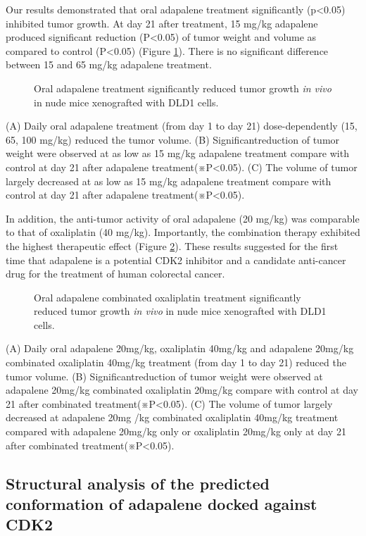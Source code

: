 Our results demonstrated that oral adapalene treatment significantly (p<0.05) inhibited tumor growth. At day 21 after treatment, 15 mg/kg adapalene produced significant reduction (P<0.05) of tumor weight and volume as compared to control (P<0.05) (Figure \ref{cdk2:Figure4}). There is no significant difference between 15 and 65 mg/kg adapalene treatment.

\begin{figure}
\centering
\caption{Oral adapalene treatment significantly reduced tumor growth \textit{in vivo} in nude mice xenografted with DLD1 cells.}
\label{cdk2:Figure4}
\end{figure}
(A) Daily oral adapalene treatment (from day 1 to day 21) dose-dependently (15, 65, 100 mg/kg) reduced the tumor volume. (B) Significantreduction of tumor weight were observed at as low as 15 mg/kg adapalene treatment compare with control at day 21 after adapalene treatment(※P<0.05). (C) The volume of tumor largely decreased at as low as 15 mg/kg adapalene treatment compare with control at day 21 after adapalene treatment(※P<0.05).

In addition, the anti-tumor activity of oral adapalene (20 mg/kg) was comparable to that of oxaliplatin (40 mg/kg). Importantly, the combination therapy exhibited the highest therapeutic effect (Figure \ref{cdk2:Figure5}). These results suggested for the first time that adapalene is a potential CDK2 inhibitor and a candidate anti-cancer drug for the treatment of human colorectal cancer.

\begin{figure}
\centering
\caption{Oral adapalene combinated oxaliplatin treatment significantly reduced tumor growth \textit{in vivo} in nude mice xenografted with DLD1 cells.}
\label{cdk2:Figure5}
\end{figure}
(A) Daily oral adapalene 20mg/kg, oxaliplatin 40mg/kg and adapalene 20mg/kg combinated oxaliplatin 40mg/kg treatment (from day 1 to day 21) reduced the tumor volume. (B) Significantreduction of tumor weight were observed at adapalene 20mg/kg combinated oxaliplatin 20mg/kg compare with control at day 21 after combinated treatment(※P<0.05). (C) The volume of tumor largely decreased at adapalene 20mg /kg combinated oxaliplatin 40mg/kg treatment compared with adapalene 20mg/kg only or oxaliplatin 20mg/kg only at day 21 after combinated treatment(※P<0.05).

\subsection{Structural analysis of the predicted conformation of adapalene docked against CDK2}

